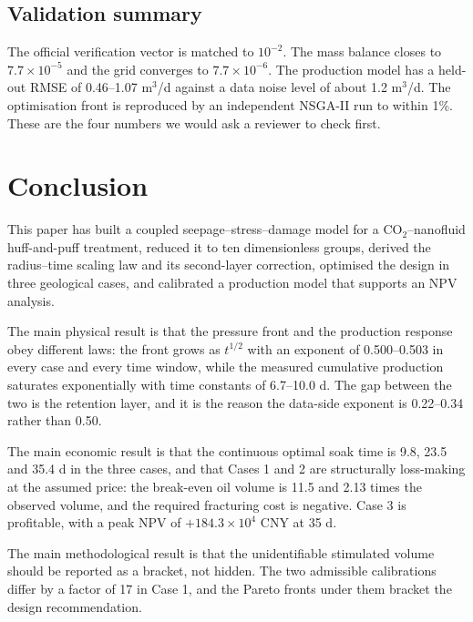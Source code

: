 \documentclass{swmcmthesis}
\begin{document}
\subsection{Validation summary}
The official verification vector is matched to $10^{-2}$. The mass balance closes to $7.7\times10^{-5}$ and the grid converges to $7.7\times10^{-6}$. The production model has a held-out RMSE of 0.46--1.07 m$^3$/d against a data noise level of about 1.2 m$^3$/d. The optimisation front is reproduced by an independent NSGA-II \cite{deb} run to within 1\%. These are the four numbers we would ask a reviewer to check first.

\section{Conclusion}
This paper has built a coupled seepage--stress--damage model for a CO$_2$--nanofluid \cite{hendraningrat} huff-and-puff treatment, reduced it to ten dimensionless groups, derived the radius--time scaling law and its second-layer correction, optimised the design in three geological cases, and calibrated a production model that supports an NPV analysis.

The main physical result is that the pressure front and the production response obey different laws: the front grows as $t^{1/2}$ with an exponent of 0.500--0.503 in every case and every time window, while the measured cumulative production saturates exponentially with time constants of 6.7--10.0 d. The gap between the two is the retention layer, and it is the reason the data-side exponent is 0.22--0.34 rather than 0.50.

The main economic result is that the continuous optimal soak time is 9.8, 23.5 and 35.4 d in the three cases, and that Cases 1 and 2 are structurally loss-making at the assumed price: the break-even oil volume is 11.5 and 2.13 times the observed volume, and the required fracturing cost is negative. Case 3 is profitable, with a peak NPV of $+184.3\times10^4$ CNY at 35 d.

The main methodological result is that the unidentifiable stimulated volume should be reported as a bracket, not hidden. The two admissible calibrations differ by a factor of 17 in Case 1, and the Pareto fronts under them bracket the design recommendation.
\end{document}
